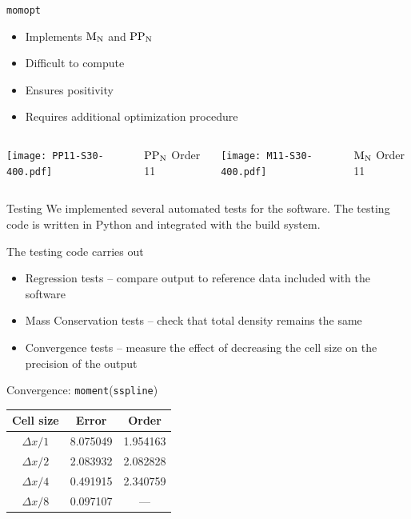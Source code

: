 \documentclass{beamer}
\newcommand{\MN}{\ensuremath{\textnormal{M}_\textnormal{N}}\xspace}
\newcommand{\PPN}{\ensuremath{\textnormal{PP}_\textnormal{N}}\xspace}
\newcommand{\moment}{\texttt{moment}\xspace}
\newcommand{\momopt}{\texttt{momopt}\xspace}
\begin{document}
    \begin{frame}{\momopt}
        \begin{itemize}
            \item Implements \MN and \PPN
            \item Difficult to compute
            \item Ensures positivity
            \item Requires additional optimization procedure
        \end{itemize}

        \vfill

        \begin{columns}
            \centering
            \texttt{[image: PP11-S30-400.pdf]}

            \PPN Order 11

            \centering
            \texttt{[image: M11-S30-400.pdf]}

            \MN Order 11
        \end{columns}
    \end{frame}

    \begin{frame}[fragile=singleslide]{Testing}
        We implemented several automated tests for the software.
        The testing code is written in Python and integrated with the build system.

        \vfill

        The testing code carries out
        \begin{itemize}
            \item Regression tests -- compare output to reference data included with the software
            \item Mass Conservation tests -- check that total density remains the same
            \item Convergence tests -- measure the effect of decreasing the cell size on the precision of the output
        \end{itemize}

        \vfill

        \begin{block}{Convergence: \moment (\texttt{sspline})}
            \centering
            \begin{tabular}{ccc}
                \toprule
                Cell size       & Error     & Order \\
                \midrule
                $\Delta x / 1$ & 8.075049 & 1.954163 \\
                $\Delta x / 2$ & 2.083932 & 2.082828 \\
                $\Delta x / 4$ & 0.491915 & 2.340759 \\
                $\Delta x / 8$ & 0.097107 & ---      \\
                \bottomrule
            \end{tabular}
        \end{block}
    \end{frame}
\end{document}
